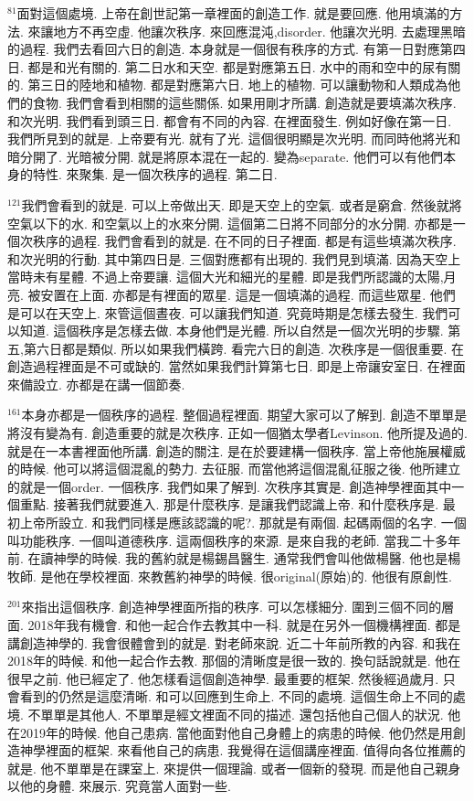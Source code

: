 \documentclass{book}
\begin{document}
$^{81}$面對這個處境.
上帝在創世記第一章裡面的創造工作.
就是要回應.
他用填滿的方法.
來讓地方不再空虛.
他讓次秩序.
來回應混沌,disorder.
他讓次光明.
去處理黑暗的過程.
我們去看回六日的創造.
本身就是一個很有秩序的方式.
有第一日對應第四日.
都是和光有關的.
第二日水和天空.
都是對應第五日.
水中的雨和空中的尿有關的.
第三日的陸地和植物.
都是對應第六日.
地上的植物.
可以讓動物和人類成為他們的食物.
我們會看到相關的這些關係.
如果用剛才所講.
創造就是要填滿次秩序.
和次光明.
我們看到頭三日.
都會有不同的內容.
在裡面發生.
例如好像在第一日.
我們所見到的就是.
上帝要有光.
就有了光.
這個很明顯是次光明.
而同時他將光和暗分開了.
光暗被分開.
就是將原本混在一起的.
變為separate.
他們可以有他們本身的特性.
來聚集.
是一個次秩序的過程.
第二日.

$^{121}$我們會看到的就是.
可以上帝做出天.
即是天空上的空氣.
或者是窮倉.
然後就將空氣以下的水.
和空氣以上的水來分開.
這個第二日將不同部分的水分開.
亦都是一個次秩序的過程.
我們會看到的就是.
在不同的日子裡面.
都是有這些填滿次秩序.
和次光明的行動.
其中第四日是.
三個對應都有出現的.
我們見到填滿.
因為天空上當時未有星體.
不過上帝要讓.
這個大光和細光的星體.
即是我們所認識的太陽,月亮.
被安置在上面.
亦都是有裡面的眾星.
這是一個填滿的過程.
而這些眾星.
他們是可以在天空上.
來管這個晝夜.
可以讓我們知道.
究竟時期是怎樣去發生.
我們可以知道.
這個秩序是怎樣去做.
本身他們是光體.
所以自然是一個次光明的步驟.
第五,第六日都是類似.
所以如果我們橫跨.
看完六日的創造.
次秩序是一個很重要.
在創造過程裡面是不可或缺的.
當然如果我們計算第七日.
即是上帝讓安室日.
在裡面來備設立.
亦都是在講一個節奏.

$^{161}$本身亦都是一個秩序的過程.
整個過程裡面.
期望大家可以了解到.
創造不單單是將沒有變為有.
創造重要的就是次秩序.
正如一個猶太學者Levinson.
他所提及過的.
就是在一本書裡面他所講.
創造的關注.
是在於要建構一個秩序.
當上帝他施展權威的時候.
他可以將這個混亂的勢力.
去征服.
而當他將這個混亂征服之後.
他所建立的就是一個order.
一個秩序.
我們如果了解到.
次秩序其實是.
創造神學裡面其中一個重點.
接著我們就要進入.
那是什麼秩序.
是讓我們認識上帝.
和什麼秩序是.
最初上帝所設立.
和我們同樣是應該認識的呢?.
那就是有兩個.
起碼兩個的名字.
一個叫功能秩序.
一個叫道德秩序.
這兩個秩序的來源.
是來自我的老師.
當我二十多年前.
在讀神學的時候.
我的舊約就是楊錫昌醫生.
通常我們會叫他做楊醫.
他也是楊牧師.
是他在學校裡面.
來教舊約神學的時候.
很original(原始)的.
他很有原創性.

$^{201}$來指出這個秩序.
創造神學裡面所指的秩序.
可以怎樣細分.
圍到三個不同的層面.
2018年我有機會.
和他一起合作去教其中一科.
就是在另外一個機構裡面.
都是講創造神學的.
我會很體會到的就是.
對老師來說.
近二十年前所教的內容.
和我在2018年的時候.
和他一起合作去教.
那個的清晰度是很一致的.
換句話說就是.
他在很早之前.
他已經定了.
他怎樣看這個創造神學.
最重要的框架.
然後經過歲月.
只會看到的仍然是這麼清晰.
和可以回應到生命上.
不同的處境.
這個生命上不同的處境.
不單單是其他人.
不單單是經文裡面不同的描述.
還包括他自己個人的狀況.
他在2019年的時候.
他自己患病.
當他面對他自己身體上的病患的時候.
他仍然是用創造神學裡面的框架.
來看他自己的病患.
我覺得在這個講座裡面.
值得向各位推薦的就是.
他不單單是在課室上.
來提供一個理論.
或者一個新的發現.
而是他自己親身以他的身體.
來展示.
究竟當人面對一些.
\end{document}
